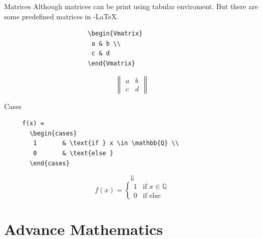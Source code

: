 \documentclass[10pt]{beamer}
\begin{document}
\begin{frame}[fragile]{Matrices }
Although matrices can be print using tabular enviroment. But there are some predefined matrices in \AmS-\LaTeX.

\begin{verbatim}
                       \begin{Vmatrix}
                        a & b \\ 
                        c & d 
                       \end{Vmatrix}
\end{verbatim}

$$\begin{Vmatrix}a & b \\ c & d \end{Vmatrix}$$

\end{frame}



\begin{frame}[fragile]{Cases}

\begin{verbatim}
     f(x) = 
       \begin{cases} 
        1       & \text{if } x \in \mathbb{Q} \\
        0       & \text{else }  
       \end{cases}
\end{verbatim}

$$\Downarrow $$
\vspace{0.5cm}
$$ f(x) = 
  \begin{cases} 
   1       & \text{if } x \in \mathbb{Q} \\
   0       & \text{if } \text{else} 
  \end{cases}$$

\end{frame}

\section{Advance Mathematics}
\end{document}

